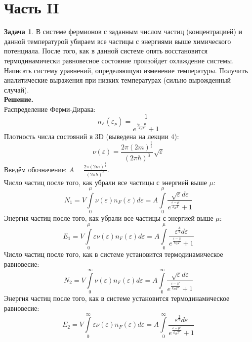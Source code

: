 \documentclass[12pt]{article}
\theoremstyle{definition}
\newtheorem{zad}{Задача}[section]
\begin{document}
\section{Часть II}
\begin{zad}
В системе фермионов с заданным числом частиц (концентрацией) и данной температурой убираем все частицы с энергиями выше химического потенциала. После того, как в данной системе опять восстановится термодинамически равновесное состояние произойдет охлаждение системы. Написать систему уравнений, определяющую изменение температуры. Получить аналитические выражения при низких температурах (сильно вырожденный случай).\\
\textbf{Решение.}\\
Распределение Ферми-Дирака:
\begin{equation}
    n_F(\varepsilon_p)=\frac{1}{e^{\frac{\varepsilon_p-\mu}{k_BT}}+1}
\end{equation}
Плотность числа состояний в 3D (выведена на лекции 4):
\begin{equation}
    \nu(\varepsilon)=\frac{2\pi(2m)^\frac{3}{2}}{(2\pi\hbar)^3}\sqrt{\varepsilon}
\end{equation}
Введём обозначение: $A=\frac{2\pi(2m)^\frac{3}{2}}{(2\pi\hbar)^3}$.\\
Число частиц после того, как убрали все частицы с энергией выше $\mu$:
\begin{equation}
    N_1=V\int\limits_0^\mu\nu(\varepsilon)n_F(\varepsilon)d\varepsilon=A\int\limits_0^\mu\frac{\sqrt{\varepsilon}d\varepsilon}{e^{\frac{\varepsilon-\mu}{k_BT}}+1}
\end{equation}
Энергия частиц после того, как убрали все частицы с энергией выше $\mu$:
\begin{equation}
    E_1=V\int\limits_0^\mu\varepsilon\nu(\varepsilon)n_F(\varepsilon)d\varepsilon=A\int\limits_0^\mu\frac{\varepsilon^\frac{3}{2}d\varepsilon}{e^{\frac{\varepsilon-\mu}{k_BT}}+1}
\end{equation}
Число частиц после того, как в системе установится термодинамическое равновесие:
\begin{equation}
    N_2=V\int\limits_0^\infty\nu(\varepsilon)n_F(\varepsilon)d\varepsilon=A\int\limits_0^\infty\frac{\sqrt{\varepsilon}d\varepsilon}{e^{\frac{\varepsilon-\mu'}{k_BT'}}+1}
\end{equation}
Энергия частиц после того, как в системе установится термодинамическое равновесие:
\begin{equation}
    E_2=V\int\limits_0^\infty\varepsilon\nu(\varepsilon)n_F(\varepsilon)d\varepsilon=A\int\limits_0^\infty\frac{\varepsilon^\frac{3}{2}d\varepsilon}{e^{\frac{\varepsilon-\mu'}{k_BT'}}+1}

\end{equation}
\end{zad}
\end{document}
